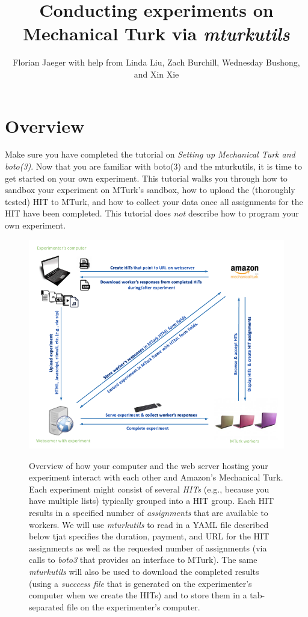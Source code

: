 \documentclass{article}
\title{Conducting experiments on Mechanical Turk via {\em mturkutils}}
\author{Florian Jaeger with help from Linda Liu, Zach Burchill, Wednesday Bushong, and Xin Xie}
\begin{document}
\maketitle

\tableofcontents

\section{Overview}

Make sure you have completed the tutorial on {\em Setting up Mechanical Turk and boto(3)}. Now that you are familiar with boto(3) and the mturkutils, it is time to get started on your own experiment. This tutorial walks you through how to sandbox your experiment on MTurk's sandbox, how to upload the (thoroughly tested) HIT to MTurk, and how to collect your data once all assignments for the HIT have been completed. This tutorial does {\em not} describe how to program your own experiment.

\begin{figure}[htbp]
\begin{center}
\includegraphics[width=.9\textwidth]{figures/visualization-of-information-flow}
\caption{Overview of how your computer and the web server hosting your experiment interact with each other and Amazon's Mechanical Turk. Each experiment might consist of several {\em HITs} (e.g., because you have multiple lists) typically grouped into a HIT group. Each HIT results in a specified number of {\em assignments} that are available to workers. We will use {\em mturkutils} to read in a YAML file described below tjat specifies the duration, payment, and URL for the HIT assignments as well as the requested number of assignments (via calls to {\em boto3} that provides an interface to MTurk). The same {\em mturkutils} will also be used to download the completed results (using a {\em succcess file} that is generated on the experimenter's computer when we create the HITs) and to store them in a tab-separated file on the experimenter's computer.}\label{fig:overview}
\label{default}
\end{center}
\end{figure}
\end{document}
